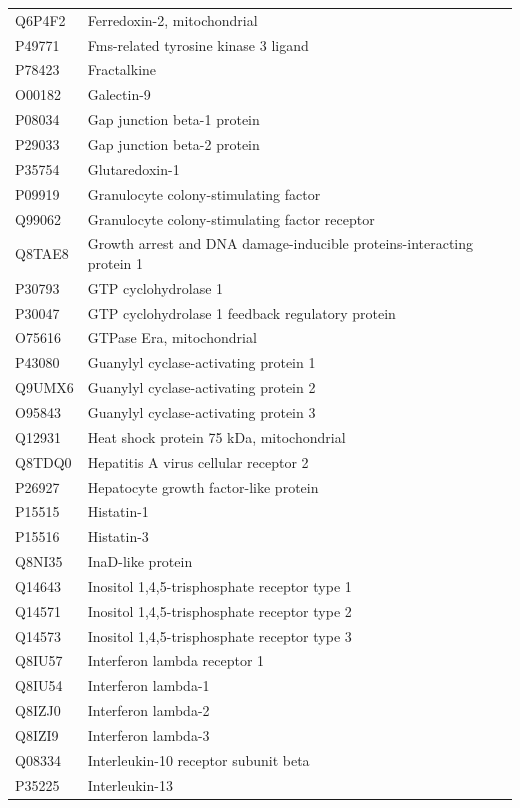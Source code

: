 \documentclass[10pt,twoside]{article}
\begin{document}
\begin{longtable}{lL{0.75\textwidth}}
Q6P4F2	&	Ferredoxin-2, mitochondrial 	\\
P49771	&	Fms-related tyrosine kinase 3 ligand 	\\
P78423	&	Fractalkine 	\\
O00182	&	Galectin-9 	\\
P08034	&	Gap junction beta-1 protein 	\\
P29033	&	Gap junction beta-2 protein 	\\
P35754	&	Glutaredoxin-1 	\\
P09919	&	Granulocyte colony-stimulating factor 	\\
Q99062	&	Granulocyte colony-stimulating factor receptor 	\\
Q8TAE8	&	Growth arrest and DNA damage-inducible proteins-interacting protein 1 	\\
P30793	&	GTP cyclohydrolase 1 	\\
P30047	&	GTP cyclohydrolase 1 feedback regulatory protein 	\\
O75616	&	GTPase Era, mitochondrial 	\\
P43080	&	Guanylyl cyclase-activating protein 1 	\\
Q9UMX6	&	Guanylyl cyclase-activating protein 2 	\\
O95843	&	Guanylyl cyclase-activating protein 3 	\\
Q12931	&	Heat shock protein 75 kDa, mitochondrial 	\\
Q8TDQ0	&	Hepatitis A virus cellular receptor 2 	\\
P26927	&	Hepatocyte growth factor-like protein 	\\
P15515	&	Histatin-1 	\\
P15516	&	Histatin-3 	\\
Q8NI35	&	InaD-like protein 	\\
Q14643	&	Inositol 1,4,5-trisphosphate receptor type 1 	\\
Q14571	&	Inositol 1,4,5-trisphosphate receptor type 2 	\\
Q14573	&	Inositol 1,4,5-trisphosphate receptor type 3 	\\
Q8IU57	&	Interferon lambda receptor 1 	\\
Q8IU54	&	Interferon lambda-1 	\\
Q8IZJ0	&	Interferon lambda-2 	\\
Q8IZI9	&	Interferon lambda-3 	\\
Q08334	&	Interleukin-10 receptor subunit beta 	\\
P35225	&	Interleukin-13 	\\

\end{longtable}
\end{document}
